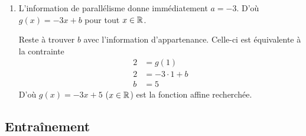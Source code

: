 {\begin{enumerate}
		\item 
			L'information de parallélisme donne immédiatement $a=-3$.
			D'où $g(x) = -3x+b$ pour tout $x\in\mathbb{R}$.
			
			Reste à trouver $b$ avec l'information d'appartenance.
			Celle-ci est équivalente à la contrainte
				\begin{align*}
					2 &= g(1) \\
					2 &= -3\cdot1 + b \\
					b &= 5
				\end{align*}
			D'où $g(x) = -3x+5$ ($x\in\mathbb{R}$) est la fonction affine recherchée.
	\end{enumerate}

}

\subsection*{Entraînement}

